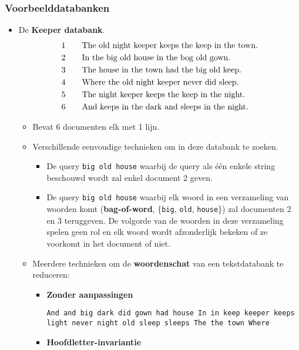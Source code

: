 \subsubsection{Voorbeelddatabanken}
\begin{itemize}
    \item De \textbf{Keeper databank}.
    \begin{align*}
        1\qquad& \hbox{The old night keeper keeps the keep in the town.}\\
        2\qquad& \hbox{In the big old house in the bog old gown.}\\
        3\qquad& \hbox{The house in the town had the big old keep.}\\
        4\qquad& \hbox{Where the old night keeper never did sleep.}\\
        5\qquad& \hbox{The night keeper keeps the keep in the night.}\\
        6\qquad& \hbox{And keeps in the dark and sleeps in the night.}\\
    \end{align*}

    \begin{itemize}
        \item Bevat 6 documenten elk met 1 lijn.

        \item Verschillende eenvoudige technieken om in deze databank te zoeken.
        \begin{itemize}
            \item De query \texttt{big old house} waarbij de query als één enkele string beschouwd wordt zal enkel document 2 geven.
            \item De query \texttt{big old house} waarbij elk woord in een verzameling van woorden komt (\textbf{bag-of-word}, \{\texttt{big}, \texttt{old}, \texttt{house}\}) zal documenten 2 en 3 teruggeven. De volgorde van de woorden in deze verzameling spelen geen rol en elk woord wordt afzonderlijk bekeken of ze voorkomt in het document of niet.
        \end{itemize}
        \item Meerdere technieken om de \textbf{woordenschat} van een tekstdatabank te reduceren:
        \begin{itemize}
            \item \textbf{Zonder aanpassingen}

            \texttt{And and big dark did gown had house In in keep keeper keeps light never night old sleep sleeps The the town Where}
            \item \textbf{Hoofdletter-invariantie}


\end{itemize}
\end{itemize}
\end{itemize}
